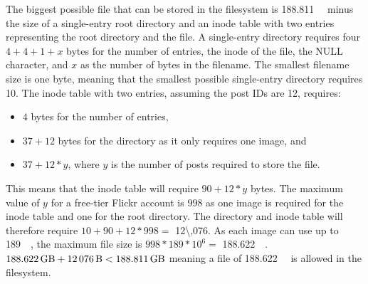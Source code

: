 The biggest possible file that can be stored in the filesystem is \SI{188.811}{\giga\byte} minus the size of a \mbox{single-entry} root directory and an inode table with two entries representing the root directory and the file. A \mbox{single-entry} directory requires four $4 + 4 + 1 + x$ bytes for the number of entries, the inode of the file, the NULL character, and $x$ as the number of bytes in the filename. The smallest filename size is one byte, meaning that the smallest possible \mbox{single-entry} directory requires \SI[per-mode = symbol]{10}{\byte}. The inode table with two entries, assuming the post IDs are \SI[per-mode = symbol]{12}{\byte}, requires:
\begin{itemize}
	\item $4$ bytes for the number of entries,
	\item $37 + 12$ bytes for the directory as it only requires one image, and
	\item $37 + 12 * y$, where $y$ is the number of posts required to store the file.
\end{itemize}
This means that the inode table will require $90 + 12 * y$ bytes. The maximum value of $y$ for a \mbox{free-tier} Flickr account is $998$ as one image is required for the inode table and one for the root directory. The directory and inode table will therefore require $10 + 90 + 12 * 998 =$ \SI[per-mode = symbol]{12\,076}{\byte}. As each image can use up to \SI[per-mode = symbol]{189}{\mega\byte}, the maximum file size is $998 * 189*10^6 =$ \SI[per-mode = symbol]{188.622}{\giga\byte}. $\text{\SI[per-mode = symbol]{188.622}{\giga\byte}} + \text{\SI[per-mode = symbol]{12\,076}{\byte}} < \SI{188.811}{\giga\byte}$ meaning a file of \SI[per-mode = symbol]{188.622}{\giga\byte} is allowed in the filesystem.


